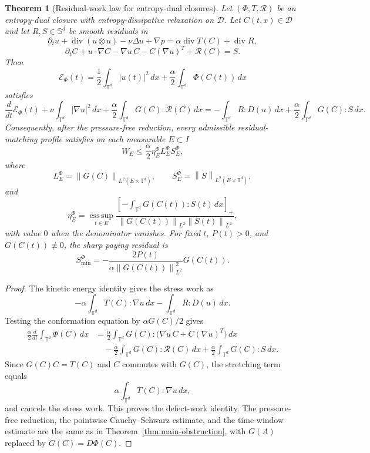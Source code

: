 \documentclass[11pt]{article}
\numberwithin{equation}{section}
\newtheorem{theorem}{Theorem}[section]
\newcommand{\T}{\mathbb T}
\newcommand{\Sym}{\mathbb S}
\newcommand{\divv}{\operatorname{div}}
\newcommand{\calE}{\mathcal E}
\newcommand{\calD}{\mathcal D}
\newcommand{\norm}[1]{\left\lVert #1\right\rVert}
\begin{document}
\begin{theorem}[Residual-work law for entropy-dual closures]
\label{thm:entropy-dual-closure}
Let \((\Phi,T,\mathcal R)\) be an entropy-dual closure with
entropy-dissipative relaxation on \(\calD\).  Let \(C(t,x)\in\calD\) and let
\(R,S\in\Sym^d\) be smooth residuals in
\[
  \partial_t u+\divv(u\otimes u)-\nu\Delta u+\nabla p
  =
  \alpha\divv T(C)+\divv R,
\]
\[
  \partial_t C+u\cdot\nabla C-\nabla u\,C-C(\nabla u)^T+\mathcal R(C)
  =
  S .
\]
Then
\[
  \calE_\Phi(t)
  =
  \frac12\int_{\T^d}|u(t)|^2\,dx
  +\frac{\alpha}{2}\int_{\T^d}\Phi(C(t))\,dx
\]
satisfies
\[
  \frac{d}{dt}\calE_\Phi(t)+\nu\int_{\T^d}|\nabla u|^2\,dx
  +\frac{\alpha}{2}\int_{\T^d}G(C):\mathcal R(C)\,dx
  =
  -\int_{\T^d}R:D(u)\,dx
  +\frac{\alpha}{2}\int_{\T^d}G(C):S\,dx .
\]
Consequently, after the pressure-free reduction, every admissible
residual-matching profile satisfies on each measurable \(E\subset I\)
\[
  W_E\le
  \frac{\alpha}{2}\eta_E^\Phi L_E^\Phi S_E^\Phi,
  \label{eq:entropy-dual-window}
\]
where
\[
  L_E^\Phi=\norm{G(C)}_{L^2(E\times\T^d)},\qquad
  S_E^\Phi=\norm{S}_{L^2(E\times\T^d)},
\]
and
\[
  \eta_E^\Phi
  =
  \operatorname*{ess\,sup}_{t\in E}
  \frac{\left[-\int_{\T^d}G(C(t)):S(t)\,dx\right]_+}
       {\norm{G(C(t))}_{L^2}\norm{S(t)}_{L^2}},
\]
with value \(0\) when the denominator vanishes.  For fixed \(t\), \(P(t)>0\),
and \(G(C(t))\not\equiv0\), the sharp paying residual is
\[
  S_{\min}^{\Phi}
  =
  -\frac{2P(t)}{\alpha\norm{G(C(t))}_{L^2}^2}G(C(t)).
\]
\end{theorem}

\begin{proof}
The kinetic energy identity gives the stress work as
\[
  -\alpha\int_{\T^d}T(C):\nabla u\,dx-\int_{\T^d}R:D(u)\,dx .
\]
Testing the conformation equation by \(\alpha G(C)/2\) gives
\begin{align*}
  \frac{\alpha}{2}\frac{d}{dt}\int_{\T^d}\Phi(C)\,dx
  &=
  \frac{\alpha}{2}\int_{\T^d}G(C):
  \bigl(\nabla u\,C+C(\nabla u)^T\bigr)\,dx\\
  &\quad
  -\frac{\alpha}{2}\int_{\T^d}G(C):\mathcal R(C)\,dx
  +\frac{\alpha}{2}\int_{\T^d}G(C):S\,dx .
\end{align*}
Since \(G(C)C=T(C)\) and \(C\) commutes with \(G(C)\), the stretching term equals
\[
  \alpha\int_{\T^d}T(C):\nabla u\,dx,
\]
and cancels the stress work.  This proves the defect-work identity.  The
pressure-free reduction, the pointwise Cauchy--Schwarz estimate, and the
time-window estimate are the same as in Theorem~\ref{thm:main-obstruction},
with \(G(A)\) replaced by \(G(C)=D\Phi(C)\).
\end{proof}
\end{document}
